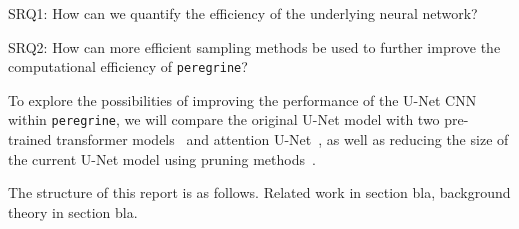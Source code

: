 \noindent SRQ1: How can we quantify the efficiency of the underlying neural network?

\noindent SRQ2: How can more efficient sampling methods be used to further improve the computational efficiency of \texttt{peregrine}?

To explore the possibilities of improving the performance of the U-Net CNN within \texttt{peregrine}, we will compare the original U-Net model with two pre-trained transformer models~\cite{Dosovitskiy_2021_ViT,Zerveas_2020_mvts} and attention U-Net~\cite{Oktay_2018_AUNet}, as well as reducing the size of the current U-Net model using pruning methods~\cite{Fang_Ma_Song_Mi_Wang_2023}.

The structure of this report is as follows. Related work in section bla, background theory in section bla.
